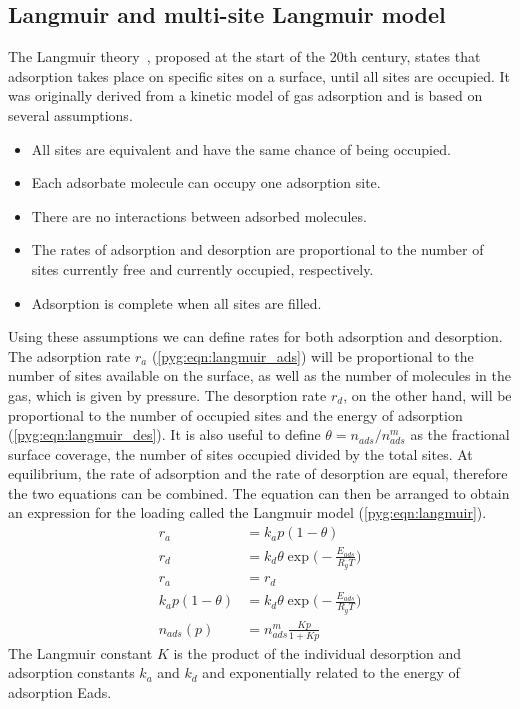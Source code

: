 \subsection{Langmuir and multi-site Langmuir
	model}\label{pyg:models:langmuir}

The Langmuir theory~\cite{langmuirAdsorptionGasesPlane1918},
proposed at the start of the 20th century, states that
adsorption takes place on specific sites on a surface, until
all sites are occupied.
It was originally derived from a kinetic model of gas adsorption and
is based on several assumptions.

\begin{itemize}

	\item All sites are equivalent and have the same chance of
	      being occupied.
	\item Each adsorbate molecule can occupy one adsorption site.
	\item There are no interactions between adsorbed molecules.
	\item The rates of adsorption and desorption are proportional
	      to the number of sites currently free and currently occupied,
	      respectively.
	\item Adsorption is complete when all sites are filled.

\end{itemize}

Using these assumptions we can define rates for both adsorption and
desorption. The adsorption rate \(r_a\) (\autoref{pyg:eqn:langmuir_ads})
will be proportional to the number of sites available on the surface,
as well as the number of molecules in the gas, which is given by
pressure.
The desorption rate \(r_d\), on the other hand, will be proportional to the
number of occupied sites and the energy of adsorption
(\autoref{pyg:eqn:langmuir_des}).
It is also useful to define \(\theta = n_{ads}/n_{ads}^m\) as the fractional
surface coverage, the number of sites occupied divided by the total 
sites. At equilibrium, the rate of adsorption and the rate of
desorption are equal, therefore the two equations can be combined.
The equation can then be arranged to obtain an expression for the
loading called the Langmuir model (\autoref{pyg:eqn:langmuir}).
%
\begin{align}
	r_a                & = k_a p (1 - \theta) \label{pyg:eqn:langmuir_ads} \\
	r_d                & = k_d \theta \exp{\Big(-\frac{E_{ads}}{R_gT}\Big)}
	\label{pyg:eqn:langmuir_des}                                           \\
	r_a                & = r_d                                             \\
	k_a p (1 - \theta) & = k_d \theta \exp{\Big(-\frac{E_{ads}}{R_gT}\Big)}  \\
	n_{ads}(p)             & = n_{ads}^m \frac{Kp}{1+Kp} \label{pyg:eqn:langmuir}
\end{align}
%
The Langmuir constant \(K\) is the product of the individual
desorption and adsorption constants \(k_a\) and \(k_d\) and exponentially
related to the energy of adsorption \gls{Eads}.

